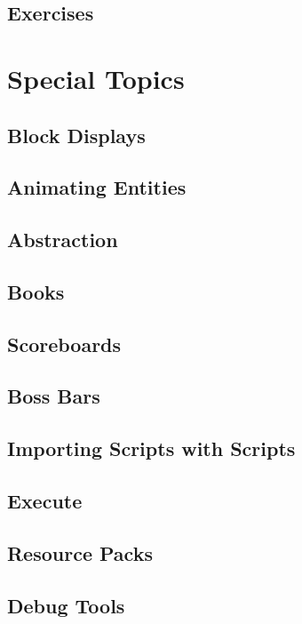 \documentclass[oneside]{book}
\begin{document}
\section{Exercises}
\blindtext

\chapter{Special Topics}
\blindtext

\section{Block Displays}
\blindtext

\section{Animating Entities}
\blindtext

\section{Abstraction}
\blindtext

\section{Books}
\blindtext

\section{Scoreboards}
\blindtext

\section{Boss Bars}
\blindtext

\section{Importing Scripts with Scripts}
\blindtext

\section{Execute}
\blindtext

\section{Resource Packs}
\blindtext

\section{Debug Tools}
\blindtext
\end{document}
